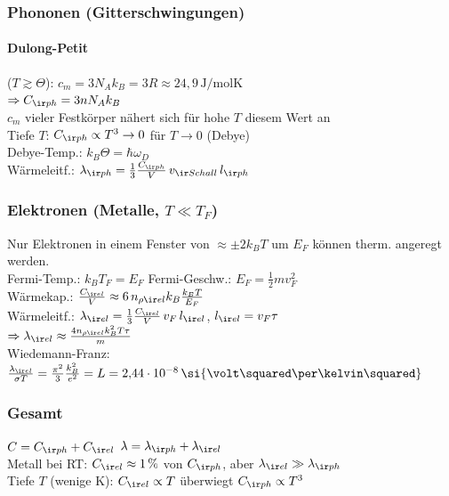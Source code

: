 \begin{sectionbox}
    \subsubsection{Phononen (Gitterschwingungen)}
    \paragraph{Dulong-Petit} ($T\gtrsim\Theta$): $c_m=3N_Ak_B=3R\approx24{,}9\,\si{\joule\per\mol\kelvin}$ \\
    $\Rightarrow C_{\ir ph}=3nN_Ak_B$ \\
    $c_m$ vieler Festkörper nähert sich für hohe $T$ diesem Wert an \\
    Tiefe $T$: $C_{\ir ph}\propto T^3\to0$ für $T\to0$ (Debye) \\
    Debye-Temp.: $k_B\Theta=\hbar\omega_D$ \\
    Wärmeleitf.: $\lambda_{\ir ph}=\frac{1}{3}\frac{C_{\ir ph}}{V}\,v_{\ir Schall}\,l_{\ir ph}$

    \subsubsection{Elektronen (Metalle, $T\ll T_F$)}
    Nur Elektronen in einem Fenster von $\approx\pm 2k_BT$ um $E_F$ können therm. angeregt werden. \\
    Fermi-Temp.: $k_BT_F=E_F$ \quad Fermi-Geschw.: $E_F=\frac{1}{2}mv_F^2$ \\
    Wärmekap.: $\frac{C_{\ir el}}{V}\approx6\,n_{\rho\ir el}k_B\frac{k_BT}{E_F}$ \\
    Wärmeleitf.: $\lambda_{\ir el}=\frac{1}{3}\frac{C_{\ir el}}{V}\,v_F\,l_{\ir el}$, \quad $l_{\ir el}=v_F\tau$ \\
    $\Rightarrow\lambda_{\ir el}\approx\frac{4n_{\rho\ir el}k_B^2T\tau}{m}$ \\
    Wiedemann-Franz: $\frac{\lambda_{\ir el}}{\sigma T}=\frac{\pi^2}{3}\frac{k_B^2}{e^2}=L=2{,}44\cdot10^{-8}\,\si{\volt\squared\per\kelvin\squared}$

    \subsubsection{Gesamt}
    $C=C_{\ir ph}+C_{\ir el}$ \quad $\lambda=\lambda_{\ir ph}+\lambda_{\ir el}$ \\
    Metall bei RT: $C_{\ir el}\approx1\,\%$ von $C_{\ir ph}$, aber $\lambda_{\ir el}\gg\lambda_{\ir ph}$ \\
    Tiefe $T$ (wenige K): $C_{\ir el}\propto T$ überwiegt $C_{\ir ph}\propto T^3$


\end{sectionbox}
